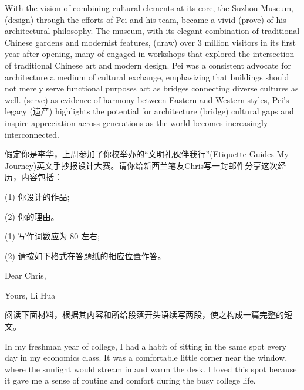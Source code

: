 \documentclass{英语试卷}
\begin{document}
\par With the vision of combining cultural elements at its core, the Suzhou Museum,  (design) through the efforts of Pei and his team, became a vivid  (prove) of his architectural philosophy. The museum, with its elegant combination of traditional Chinese gardens and modernist features,  (draw) over 3 million visitors in its first year after opening, many of  engaged in workshops that explored the intersection of traditional Chinese art and modern design. Pei was a consistent advocate for architecture  a medium of cultural exchange, emphasizing that buildings should not merely serve functional purposes  act as bridges connecting diverse cultures as well.  (serve) as evidence of harmony between Eastern and Western styles, Pei's legacy (遗产) highlights the potential for architecture  (bridge) cultural gaps and inspire appreciation across generations as the world becomes increasingly interconnected.\par
{}
\par 假定你是李华，上周参加了你校举办的“文明礼伙伴我行”(Etiquette Guides My Journey)英文手抄报设计大赛。请你给新西兰笔友Chris写一封邮件分享这次经历，内容包括：\par
\par (1) 你设计的作品;\par
\par (2) 你的理由。\par
\par (1) 写作词数应为 80 左右;\par
\par (2) 请按如下格式在答题纸的相应位置作答。\par
\par Dear Chris,\par
{}
\par Yours, Li Hua\par
{}
\par 阅读下面材料，根据其内容和所给段落开头语续写两段，使之构成一篇完整的短文。\par
\par In my freshman year of college, I had a habit of sitting in the same spot every day in my economics class. It was a comfortable little corner near the window, where the sunlight would stream in and warm the desk. I loved this spot because it gave me a sense of routine and comfort during the busy college life.\par
\end{document}
